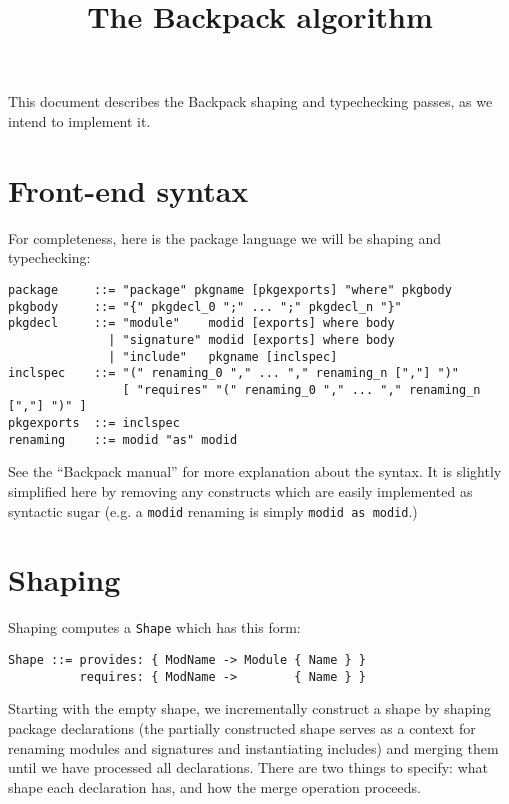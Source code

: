 \documentclass{article}
\title{The Backpack algorithm}
\begin{document}
\maketitle

This document describes the Backpack shaping and typechecking
passes, as we intend to implement it.

\section{Front-end syntax}

For completeness, here is the package language we will be shaping and typechecking:

\begin{verbatim}
package     ::= "package" pkgname [pkgexports] "where" pkgbody
pkgbody     ::= "{" pkgdecl_0 ";" ... ";" pkgdecl_n "}"
pkgdecl     ::= "module"    modid [exports] where body
              | "signature" modid [exports] where body
              | "include"   pkgname [inclspec]
inclspec    ::= "(" renaming_0 "," ... "," renaming_n [","] ")"
                [ "requires" "(" renaming_0 "," ... "," renaming_n [","] ")" ]
pkgexports  ::= inclspec
renaming    ::= modid "as" modid
\end{verbatim}

See the ``Backpack manual'' for more explanation about the syntax.  It
is slightly simplified here by removing any constructs which are easily implemented as
syntactic sugar (e.g. a \verb|modid| renaming is simply \verb|modid as modid|.)

\section{Shaping}

Shaping computes a \verb|Shape| which has this form:

\begin{verbatim}
Shape ::= provides: { ModName -> Module { Name } }
          requires: { ModName ->        { Name } }
\end{verbatim}

Starting with the empty shape, we incrementally construct a shape by
shaping package declarations (the partially constructed shape serves as
a context for renaming modules and signatures and instantiating
includes) and merging them until we have processed all declarations.
There are two things to specify: what shape each declaration has, and
how the merge operation proceeds.
\end{document}
